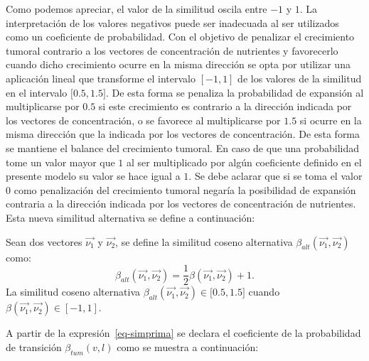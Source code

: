 Como podemos apreciar, el valor de la similitud oscila entre $-1$ y $1$. La interpretaci\'on de los valores negativos puede ser inadecuada al ser utilizados como un coeficiente de probabilidad. Con el objetivo de penalizar el crecimiento tumoral contrario a los vectores de concentraci\'on de nutrientes y favorecerlo cuando dicho crecimiento ocurre en la misma direcci\'on se opta por utilizar una aplicaci\'on lineal que transforme el intervalo $[-1,1]$ de los valores de la similitud en el intervalo $[0$.$5, 1$.$5]$. De esta forma se penaliza la probabilidad de expansi\'on al multiplicarse por $0$.$5$ si este crecimiento es contrario a la direcci\'on indicada por los vectores de concentraci\'on, o se favorece al multiplicarse por $1$.$5$ si ocurre en la misma direcci\'on que la indicada por los vectores de concentraci\'on. De esta forma se mantiene el balance del crecimiento tumoral. En caso de que una probabilidad tome un valor mayor que $1$ al ser multiplicado por alg\'un coeficiente definido en el presente modelo su valor se hace igual a $1$. Se debe aclarar que si se toma el valor $0$ como penalizaci\'on del crecimiento tumoral negar\'ia la posibilidad de expansi\'on contraria a la direcci\'on indicada por los vectores de concentraci\'on de nutrientes. Esta nueva similitud alternativa se define a continuaci\'on:

\begin{definition}
\label{def-simprima}
Sean dos vectores $\overrightarrow{\nu_1}$ y $\overrightarrow{\nu_2}$, se define la similitud coseno alternativa $\beta_{alt}(\overrightarrow{\nu_1},\overrightarrow{\nu_2})$ como:
\begin{equation}
\beta_{alt}(\overrightarrow{\nu_1},\overrightarrow{\nu_2}) = \frac{1}{2} \beta(\overrightarrow{\nu_1},\overrightarrow{\nu_2}) + 1. \label{eq-simprima}
\end{equation}
La similitud coseno alternativa $\beta_{alt}(\overrightarrow{\nu_1},\overrightarrow{\nu_2}) \in [0$.$5, 1$.$5]$ cuando $\beta(\overrightarrow{\nu_1},\overrightarrow{\nu_2}) \in [-1, 1]$. 
\end{definition}

A partir de la expresi\'on~\ref{eq-simprima} se declara el coeficiente de la probabilidad de transici\'on $\beta_{tum}(v,l)$ como se muestra a continuaci\'on:

